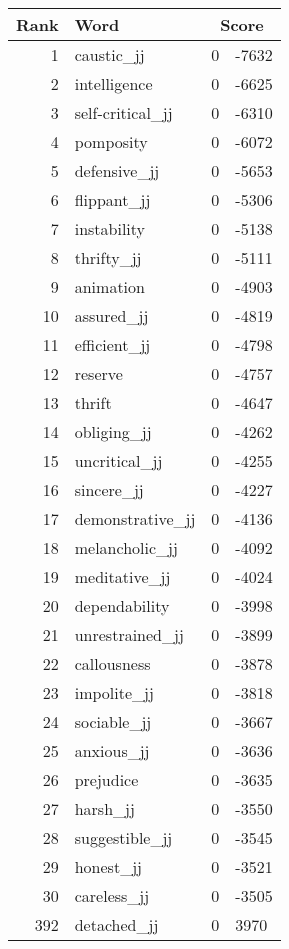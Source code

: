 \begin{longtable}[!htbp]{| rlr@{.}l |}
    \hline
    \textbf{Rank} & \textbf{Word} & \multicolumn{2}{c|}{\textbf{Score}} \\
    \hline
    \endhead
    1 & caustic\_jj & 0 & -7632 \\
    2 & intelligence & 0 & -6625 \\
    3 & self-critical\_jj & 0 & -6310 \\
    4 & pomposity & 0 & -6072 \\
    5 & defensive\_jj & 0 & -5653 \\
    6 & flippant\_jj & 0 & -5306 \\
    7 & instability & 0 & -5138 \\
    8 & thrifty\_jj & 0 & -5111 \\
    9 & animation & 0 & -4903 \\
    10 & assured\_jj & 0 & -4819 \\
    11 & efficient\_jj & 0 & -4798 \\
    12 & reserve & 0 & -4757 \\
    13 & thrift & 0 & -4647 \\
    14 & obliging\_jj & 0 & -4262 \\
    15 & uncritical\_jj & 0 & -4255 \\
    16 & sincere\_jj & 0 & -4227 \\
    17 & demonstrative\_jj & 0 & -4136 \\
    18 & melancholic\_jj & 0 & -4092 \\
    19 & meditative\_jj & 0 & -4024 \\
    20 & dependability & 0 & -3998 \\
    21 & unrestrained\_jj & 0 & -3899 \\
    22 & callousness & 0 & -3878 \\
    23 & impolite\_jj & 0 & -3818 \\
    24 & sociable\_jj & 0 & -3667 \\
    25 & anxious\_jj & 0 & -3636 \\
    26 & prejudice & 0 & -3635 \\
    27 & harsh\_jj & 0 & -3550 \\
    28 & suggestible\_jj & 0 & -3545 \\
    29 & honest\_jj & 0 & -3521 \\
    30 & careless\_jj & 0 & -3505 \\
    392 & detached\_jj & 0 & 3970 \\

\end{longtable}
